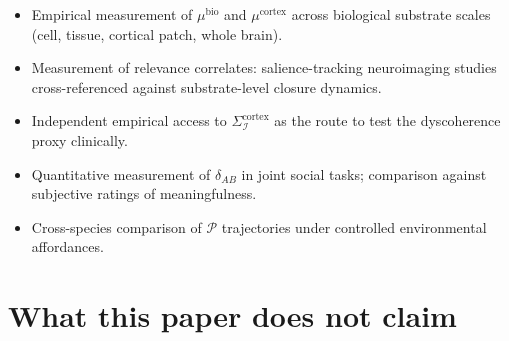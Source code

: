 \documentclass[11pt]{article}
\theoremstyle{plain}
\theoremstyle{definition}
\theoremstyle{remark}
\newcommand{\Ical}{\mathcal{I}}
\newcommand{\Pcal}{\mathcal{P}}
\begin{document}
\begin{itemize}[leftmargin=2em]
\item Empirical measurement of $\mu^{\mathrm{bio}}$ and $\mu^{\mathrm{cortex}}$ across biological substrate scales (cell, tissue, cortical patch, whole brain).
\item Measurement of relevance correlates: salience-tracking neuroimaging studies cross-referenced against substrate-level closure dynamics.
\item Independent empirical access to $\Sigma_\Ical^{\mathrm{cortex}}$ as the route to test the dyscoherence proxy clinically.
\item Quantitative measurement of $\delta_{AB}$ in joint social tasks; comparison against subjective ratings of meaningfulness.
\item Cross-species comparison of $\Pcal$ trajectories under controlled environmental affordances.
\end{itemize}

\section{What this paper does not claim}\label{sec:scope}
\end{document}
